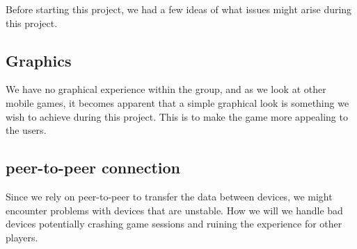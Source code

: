 Before starting this project, we had a few ideas of what issues might arise during this project.

\subsection{Graphics}
We have no graphical experience within the group, and as we look at other mobile games, it becomes apparent that a simple graphical look is something we wish to achieve during this project. This is to make the game more appealing to the users.

\subsection{peer-to-peer connection}
Since we rely on peer-to-peer to transfer the data between devices, we might encounter problems with devices that are unstable. How we will we handle bad devices potentially crashing game sessions and ruining the experience for other players.